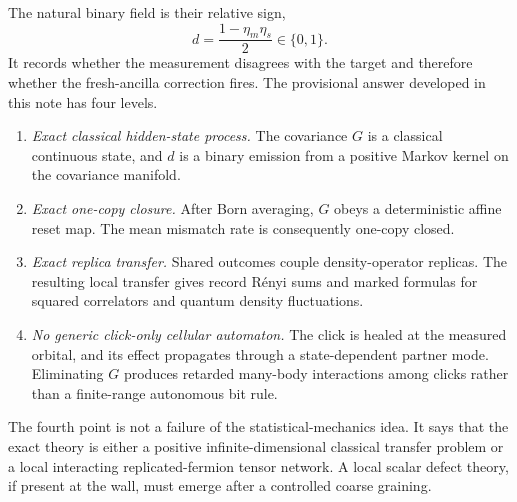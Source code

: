 \documentclass[
  aps,prx,twocolumn,superscriptaddress,longbibliography,
  nofootinbib,floatfix
]{revtex4-2}
\theoremstyle{plain}
\theoremstyle{definition}
\begin{document}
The natural binary field is their relative sign,
\begin{equation}
 d=\frac{1-\eta_m\eta_s}{2}\in\{0,1\}.
 \label{eq:defect-definition-intro}
\end{equation}
It records whether the measurement disagrees with the target and therefore
whether the fresh-ancilla correction fires.  The provisional answer developed
in this note has four levels.
\begin{enumerate}
 \item \emph{Exact classical hidden-state process.}  The covariance \(G\) is a
 classical continuous state, and \(d\) is a binary emission from a positive
 Markov kernel on the covariance manifold.
 \item \emph{Exact one-copy closure.}  After Born averaging, \(G\) obeys a
 deterministic affine reset map.  The mean mismatch rate is consequently
 one-copy closed.
 \item \emph{Exact replica transfer.}  Shared outcomes couple density-operator
 replicas.  The resulting local transfer gives record R\'enyi sums and marked
 formulas for squared correlators and quantum density fluctuations.
 \item \emph{No generic click-only cellular automaton.}  The click is healed at
 the measured orbital, and its effect propagates through a state-dependent
 partner mode.  Eliminating \(G\) produces retarded many-body interactions
 among clicks rather than a finite-range autonomous bit rule.
\end{enumerate}
The fourth point is not a failure of the statistical-mechanics idea.  It says
that the exact theory is either a positive infinite-dimensional classical
transfer problem or a local interacting replicated-fermion tensor network.
A local scalar defect theory, if present at the wall, must emerge after a
controlled coarse graining.
\end{document}
